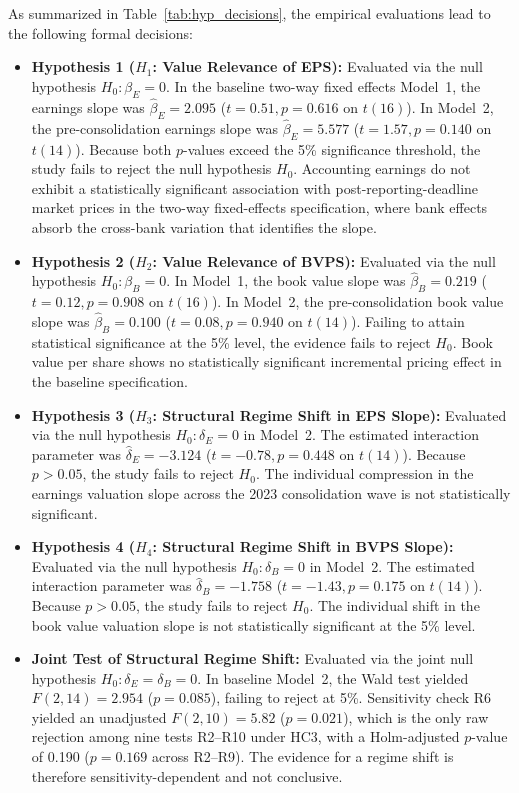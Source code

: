 As summarized in Table~\ref{tab:hyp_decisions}, the empirical evaluations lead to the following formal decisions:
\begin{itemize}
    \item \textbf{Hypothesis 1 ($H_1$: Value Relevance of EPS):} Evaluated via the null hypothesis $H_0: \beta_E = 0$. In the baseline two-way fixed effects Model~1, the earnings slope was $\hat{\beta}_E = 2.095$ ($t = 0.51, p = 0.616$ on $t(16)$). In Model~2, the pre-consolidation earnings slope was $\hat{\beta}_E = 5.577$ ($t = 1.57, p = 0.140$ on $t(14)$). Because both $p$-values exceed the 5\% significance threshold, the study fails to reject the null hypothesis $H_0$. Accounting earnings do not exhibit a statistically significant association with post-reporting-deadline market prices in the two-way fixed-effects specification, where bank effects absorb the cross-bank variation that identifies the slope.
    \item \textbf{Hypothesis 2 ($H_2$: Value Relevance of BVPS):} Evaluated via the null hypothesis $H_0: \beta_B = 0$. In Model~1, the book value slope was $\hat{\beta}_B = 0.219$ ($t = 0.12, p = 0.908$ on $t(16)$). In Model~2, the pre-consolidation book value slope was $\hat{\beta}_B = 0.100$ ($t = 0.08, p = 0.940$ on $t(14)$). Failing to attain statistical significance at the 5\% level, the evidence fails to reject $H_0$. Book value per share shows no statistically significant incremental pricing effect in the baseline specification.
    \item \textbf{Hypothesis 3 ($H_3$: Structural Regime Shift in EPS Slope):} Evaluated via the null hypothesis $H_0: \delta_E = 0$ in Model~2. The estimated interaction parameter was $\hat{\delta}_E = -3.124$ ($t = -0.78, p = 0.448$ on $t(14)$). Because $p > 0.05$, the study fails to reject $H_0$. The individual compression in the earnings valuation slope across the 2023 consolidation wave is not statistically significant.
    \item \textbf{Hypothesis 4 ($H_4$: Structural Regime Shift in BVPS Slope):} Evaluated via the null hypothesis $H_0: \delta_B = 0$ in Model~2. The estimated interaction parameter was $\hat{\delta}_B = -1.758$ ($t = -1.43, p = 0.175$ on $t(14)$). Because $p > 0.05$, the study fails to reject $H_0$. The individual shift in the book value valuation slope is not statistically significant at the 5\% level.
    \item \textbf{Joint Test of Structural Regime Shift:} Evaluated via the joint null hypothesis $H_0: \delta_E = \delta_B = 0$. In baseline Model~2, the Wald test yielded $F(2,14)=2.954$ ($p=0.085$), failing to reject at 5\%. Sensitivity check R6 yielded an unadjusted $F(2,10)=5.82$ ($p=0.021$), which is the only raw rejection among nine tests R2--R10 under HC3, with a Holm-adjusted $p$-value of 0.190 ($p = 0.169$ across R2--R9). The evidence for a regime shift is therefore sensitivity-dependent and not conclusive.
\end{itemize}

